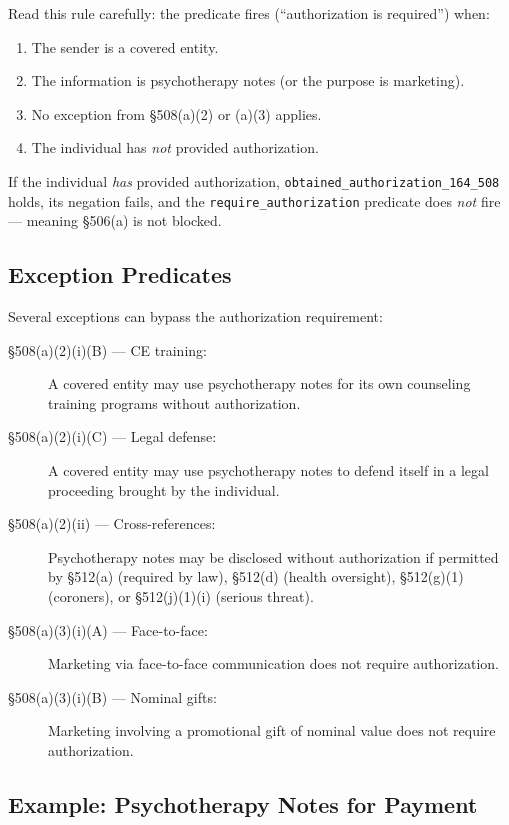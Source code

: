 \documentclass[11pt,letterpaper]{article}
\begin{document}
Read this rule carefully: the predicate fires (``authorization is required'') when:
\begin{enumerate}
  \item The sender is a covered entity.
  \item The information is psychotherapy notes (or the purpose is marketing).
  \item No exception from \S 508(a)(2) or (a)(3) applies.
  \item The individual has \emph{not} provided authorization.
\end{enumerate}

If the individual \emph{has} provided authorization, \texttt{obtained\_authorization\_164\_508} holds, its negation fails, and the \texttt{require\_authorization} predicate does \emph{not} fire --- meaning \S 506(a) is not blocked.

\subsection{Exception Predicates}

Several exceptions can bypass the authorization requirement:

\begin{description}
  \item[\S 508(a)(2)(i)(B) --- CE training:] A covered entity may use psychotherapy notes for its own counseling training programs without authorization.
  \item[\S 508(a)(2)(i)(C) --- Legal defense:] A covered entity may use psychotherapy notes to defend itself in a legal proceeding brought by the individual.
  \item[\S 508(a)(2)(ii) --- Cross-references:] Psychotherapy notes may be disclosed without authorization if permitted by \S 512(a) (required by law), \S 512(d) (health oversight), \S 512(g)(1) (coroners), or \S 512(j)(1)(i) (serious threat).
  \item[\S 508(a)(3)(i)(A) --- Face-to-face:] Marketing via face-to-face communication does not require authorization.
  \item[\S 508(a)(3)(i)(B) --- Nominal gifts:] Marketing involving a promotional gift of nominal value does not require authorization.
\end{description}

\subsection{Example: Psychotherapy Notes for Payment}
\end{document}
